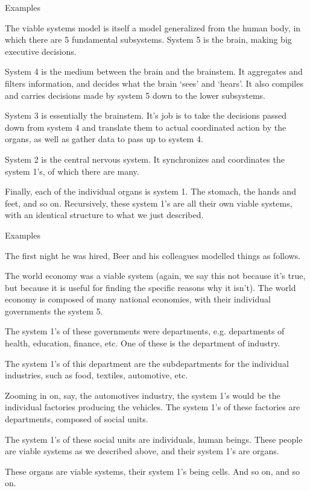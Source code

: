 \documentclass{beamer}
\begin{document}
\begin{frame}{Examples}
    \begin{itemize}
        {\small \item The viable systems model is itself a model generalized from the human body, in which there are 5 fundamental subsystems. System 5 is the brain, making big executive decisions. 
        \item System 4 is the medium between the brain and the brainstem. It aggregates and filters information, and decides what the brain `sees' and `hears'. It also compiles and carries decisions made by system 5 down to the lower subsystems. 
        \item System 3 is essentially the brainstem. It's job is to take the decisions passed down from system 4 and translate them to actual coordinated action by the organs, as well as gather data to pass up to system 4. 
        \item System 2 is the central nervous system. It synchronizes and coordinates the system 1's, of which there are many. 
        \item Finally, each of the individual organs is system 1. The stomach, the hands and feet, and so on. Recursively, these system 1's are all their own viable systems, with an identical structure to what we just described.}
    \end{itemize}
\end{frame}

\begin{frame}{Examples}
    \begin{itemize}
        {\small \item The first night he was hired, Beer and his colleagues modelled things as follows.
        \item The world economy was a viable system (again, we say this not because it's true, but because it is useful for finding the specific reasons why it isn't). The world economy is composed of many national economies, with their individual governments the system 5. 
        \item The system 1's of these governments were departments, e.g. departments of health, education, finance, etc. One of these is the department of industry. 
        \item The system 1's of this department are the subdepartments for the individual industries, such as food, textiles, automotive, etc. 
        \item Zooming in on, say, the automotives industry, the system 1's would be the individual factories producing the vehicles. The system 1's of these factories are departments, composed of social units. 
        \item The system 1's of these social units are individuals, human beings. These people are viable systems as we described above, and their system 1's are organs. 
        \item These organs are viable systems, their system 1's being cells. And so on, and so on. }
    \end{itemize}
\end{frame}
\end{document}

